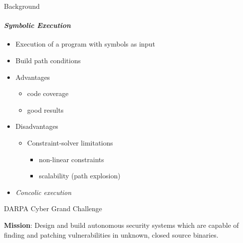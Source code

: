 \documentclass[pdf]{beamer}
\begin{document}
\begin{frame}{Background}
\framesubtitle{\textit{Symbolic Execution}}
\begin{itemize}
\item Execution of a program with symbols as input
\item Build path conditions
\item Advantages
	\begin{itemize}
	\item code coverage
	\item good results
	\end{itemize} 
\item Disadvantages
	\begin{itemize}
	\item Constraint-solver limitations
		\begin{itemize}
		\item non-linear constraints
		\item scalability (path explosion)
		\end{itemize}
	\end{itemize}
\item \textit{Concolic execution}
\end{itemize}
\end{frame}

\begin{frame}{DARPA Cyber Grand Challenge}

\textbf{Mission}: Design and build autonomous security systems which are capable of finding and patching vulnerabilities in unknown, closed source binaries.

\end{frame}
\end{document}
